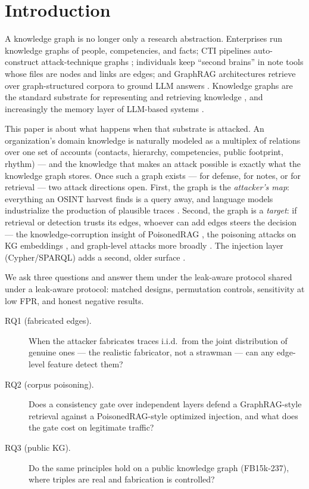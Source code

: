 \documentclass[conference]{IEEEtran}
\begin{document}
\section{Introduction}
\label{sec:intro}
A knowledge graph is no longer only a research abstraction. Enterprises run
knowledge graphs of people, competencies, and facts; CTI pipelines
auto-construct attack-technique graphs \cite{fieblinger2024actionable,
cheng2024ctinexus}; individuals keep ``second brains'' in note tools whose
files are nodes and links are edges; and GraphRAG architectures retrieve over
graph-structured corpora to ground LLM answers \cite{edge2024graphrag,
han2025graphrag}. Knowledge graphs are the standard substrate for
representing and retrieving knowledge \cite{hogan2021knowledge,ji2022survey},
and increasingly the memory layer of LLM-based systems \cite{pan2024roadmap}.

This paper is about what happens when that substrate is attacked. An
organization's domain knowledge is naturally modeled as a multiplex of
relations over one set of accounts (contacts, hierarchy, competencies,
public footprint, rhythm) --- and the knowledge that makes an attack
possible is exactly what the knowledge graph stores. Once
such a graph exists --- for defense, for notes, or for retrieval --- two
attack directions open. First, the graph is the \emph{attacker's map}:
everything an OSINT harvest finds \cite{edwards2017panning} is a query away,
and language models industrialize the production of plausible traces
\cite{heiding2024evaluating,brown2025web}. Second, the graph is a
\emph{target}: if retrieval or detection trusts its edges, whoever can add
edges steers the decision --- the knowledge-corruption insight of PoisonedRAG
\cite{zou2024poisonedrag,zhong2023poisoning}, the poisoning attacks on KG
embeddings \cite{zhang2019poisoning,you2023mass}, and graph-level attacks
more broadly \cite{sun2019adversarial,zugner2018adversarial}. The injection
layer (Cypher/SPARQL) adds a second, older surface \cite{ron2015nosql}.

We ask three questions and answer them under the leak-aware protocol shared
under a leak-aware protocol: matched designs, permutation controls, sensitivity
at low FPR, and honest negative results.

\begin{description}
\item[RQ1 (fabricated edges).] When the attacker fabricates traces i.i.d.\
from the joint distribution of genuine ones --- the realistic fabricator, not
a strawman --- can any edge-level feature detect them?
\item[RQ2 (corpus poisoning).] Does a consistency gate over independent layers
defend a GraphRAG-style retrieval against a PoisonedRAG-style optimized
injection, and what does the gate cost on legitimate traffic?
\item[RQ3 (public KG).] Do the same principles hold on a public
knowledge graph (FB15k-237), where triples are real and fabrication is
controlled?
\end{description}
\end{document}
